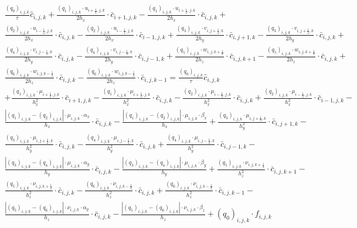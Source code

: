 \documentclass[12pt]{article}
\begin{document}
\begin{multline}
 \frac{(q_0)_{i,j,k}}{\tau}\hat{c}_{i,j,k} + \frac{(q_1)_{i,j,k}\cdot u_{i+\frac{1}{2},j,k}}{2h_x} \cdot \bar{c}_{i+1,j,k} - \frac{(q_1)_{i,j,k}\cdot u_{i+\frac{1}{2},j,k}}{2h_x} \cdot \bar{c}_{i,j,k} + \\
 \frac{(q_2)_{i,j,k}\cdot u_{i-\frac{1}{2},j,k}}{2h_x} \cdot \bar{c}_{i,j,k} - \frac{(q_2)_{i,j,k}\cdot u_{i-\frac{1}{2},j,k}}{2h_x} \cdot \bar{c}_{i-1,j,k} + 
 \frac{(q_3)_{i,j,k}\cdot v_{i,j+\frac{1}{2},k}}{2h_y} \cdot \bar{c}_{i,j+1,k} - 
 \frac{(q_3)_{i,j,k}\cdot v_{i,j+\frac{1}{2},k}}{2h_y} \cdot \bar{c}_{i,j,k} + \\
 \frac{(q_4)_{i,j,k}\cdot v_{i,j-\frac{1}{2},k}}{2h_y} \cdot \bar{c}_{i,j,k} - \frac{(q_4)_{i,j,k}\cdot v_{i,j-\frac{1}{2},k}}{2h_y} \cdot \bar{c}_{i,j-1,k} + 
 \frac{(q_5)_{i,j,k}\cdot w_{i,j,k+\frac{1}{2}}}{2h_z} \cdot \bar{c}_{i,j,k+1} - 
 \frac{(q_5)_{i,j,k}\cdot w_{i,j,k+\frac{1}{2}}}{2h_z} \cdot \bar{c}_{i,j,k} + \\
 \frac{(q_6)_{i,j,k}\cdot w_{i,j,k-\frac{1}{2}}}{2h_z} \cdot \bar{c}_{i,j,k} - 
 \frac{(q_6)_{i,j,k}\cdot w_{i,j,k-\frac{1}{2}}}{2h_z} \cdot \bar{c}_{i,j,k-1} =  
 \frac{(q_0)_{i,j,k}}{\tau}\hat{c}_{i,j,k} \\
  + \frac{(q_1)_{i,j,k}\cdot \mu_{i+\frac{1}{2},j,k}}{h_x^2} \cdot \bar{c}_{i+1,j,k} -  \frac{(q_1)_{i,j,k}\cdot \mu_{i+\frac{1}{2},j,k}}{h_x^2} \cdot \bar{c}_{i,j,k} - 
 \frac{(q_2)_{i,j,k}\cdot \mu_{i-\frac{1}{2},j,k}}{h_x^2} \cdot \bar{c}_{i,j,k} + 
 \frac{(q_2)_{i,j,k}\cdot \mu_{i-\frac{1}{2},j,k}}{h_x^2} \cdot \bar{c}_{i-1,j,k} - \\
 \frac{|(q_1)_{i,j,k} - (q_2)_{i,j,k}| \cdot \mu_{i,j,k} \cdot \alpha_x}{h_x} \cdot \bar{c}_{i,j,k} - \frac{|(q_1)_{i,j,k} - (q_2)_{i,j,k}| \cdot \mu_{i,j,k} \cdot \beta_x}{h_x}  + 
 \frac{(q_3)_{i,j,k}\cdot \mu_{i,j+\frac{1}{2},k}}{h_y^2} \cdot \bar{c}_{i,j+1,k} -\\
 \frac{(q_3)_{i,j,k}\cdot \mu_{i,j+\frac{1}{2},k}}{h_y^2} \cdot \bar{c}_{i,j,k} - 
 \frac{(q_4)_{i,j,k}\cdot \mu_{i,j-\frac{1}{2},k}}{h_y^2} \cdot \bar{c}_{i,j,k} + 
 \frac{(q_4)_{i,j,k}\cdot \mu_{i,j-\frac{1}{2},k}}{h_y^2} \cdot \bar{c}_{i,j-1,k} -\\
 \frac{|(q_3)_{i,j,k} - (q_4)_{i,j,k}| \cdot \mu_{i,j,k} \cdot \alpha_y}{h_y} \cdot \bar{c}_{i,j,k} - 
 \frac{|(q_3)_{i,j,k} - (q_4)_{i,j,k}| \cdot \mu_{i,j,k} \cdot \beta_y}{h_y} + 
 \frac{(q_5)_{i,j,k}\cdot \nu_{i,j,k+\frac{1}{2}}}{h_z^2} \cdot \bar{c}_{i,j,k+1} - \\
 \frac{(q_5)_{i,j,k}\cdot \nu_{i,j,k+\frac{1}{2}}}{h_z^2} \cdot \bar{c}_{i,j,k} - 
 \frac{(q_6)_{i,j,k}\cdot \nu_{i,j,k-\frac{1}{2}}}{h_z^2} \cdot \bar{c}_{i,j,k} +
 \frac{(q_6)_{i,j,k}\cdot \nu_{i,j,k-\frac{1}{2}}}{h_z^2} \cdot \bar{c}_{i,j,k-1} - \\
  \frac{|(q_5)_{i,j,k} - (q_6)_{i,j,k}| \cdot \nu_{i,j,k} \cdot \alpha_y}{h_z} \cdot \bar{c}_{i,j,k} - \frac{|(q_5)_{i,j,k} - (q_6)_{i,j,k}| \cdot \nu_{i,j,k} \cdot \beta_z}{h_z} + {(q_0)_{i,j,k}}\cdot f_{i,j,k}
\end{multline}
\end{document}
